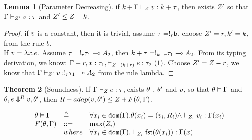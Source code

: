 \documentclass[a4paper,11pt]{article}
\theoremstyle{definition}
\newtheorem{thm}{Theorem}
\newtheorem{lem}[thm]{Lemma}
\begin{document}
\begin{lem}[Parameter Decreasing]
  \label{para-dec}
  if  $k+\Gamma \vdash_{Z} v : k+ \tau  $, then exists 
  $Z'$ so
  that   $\Gamma \vdash_{Z' } v :
  \tau$ and  $Z' \leq Z-k $.
\end{lem}
\begin{proof}
  if $v$ is a constant, then it is trivial, assume $\tau =
  !_{r} \mathtt{b}$, choose
  $Z' = r, k'=k$, from the rule $b$.  \\
  If $v = \lambda
  x. e$. Assume $\tau = !_{r} \tau_1 \multimap A_2 $, then $k+\tau =
  !_{k+r} \tau_1 \multimap A_2 $. From its typing derivation, we know: $\Gamma-r, x: \tau_1, 
   \vdash_{Z - (k+r) } e: \tau_2 ~(1)$. Choose $Z' =
   Z -r$, we know that $\Gamma  \vdash_{Z' } v :
  !_{r} \tau_1 \multimap A_2$ from the rule lambda.
\end{proof}

\begin{thm}[Soundness]
\label{soundness}
If $\Gamma \vdash_{Z} e : \tau$, exists $\theta$ , $\theta'$ and $v$,
so that $\theta \vDash \Gamma$ and $\theta , e \mathrel{\Downarrow^{R}} v,
\theta'  $, then  $ R + adap(v, \theta')  \leq  Z + F(\theta,\Gamma)$.  
\end{thm}
\[
  \begin{array}{lll}
     \env \vDash \Gamma &\triangleq  & 
                                        \forall x_i \in \dom( \Gamma) . \env(x_i) =
                                       (\valr_i, \adapt_i) \land
                                       \empty \tvdash{\nnatA_i} \valr_i
                                       : \Gamma(x_i)   \\
    F(\env,\Gamma) & ::= &  \max(\nnatA_i)    \\
    & where &   \forall x_i \in \dom(\Gamma). \empty \tvdash{\nnatA_i}
              \mathsf{fst} (\env(x_i) )
                                       : \Gamma(x)   \\
    \end{array}
\]
\end{document}
